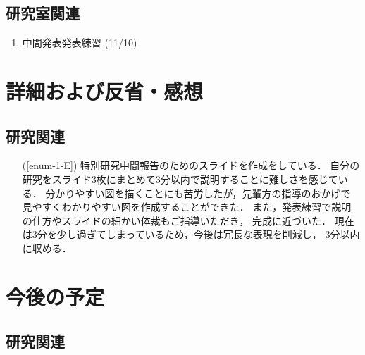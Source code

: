 \documentclass[fleqn, 14pt]{extarticle}
\begin{document}
\subsection{研究室関連}
\label{sec-2-2}
\begin{enumerate}
\item 中間発表発表練習
\hfill
\label{enum-lab1}
(11/10)
\end{enumerate}





\section{詳細および反省・感想}
\label{sec-3}
\subsection{研究関連}
\label{sec-3-1}

\begin{itemize}
\item[(\ref{enum-1-E})]
特別研究中間報告のためのスライドを作成をしている．
自分の研究をスライド3枚にまとめて3分以内で説明することに難しさを感じている．
分かりやすい図を描くことにも苦労したが，先輩方の指導のおかげで
見やすくわかりやすい図を作成することができた．
また，発表練習で説明の仕方やスライドの細かい体裁もご指導いただき，
完成に近づいた．
現在は3分を少し過ぎてしまっているため，今後は冗長な表現を削減し，
3分以内に収める．
\end{itemize}


\section{今後の予定}
\label{sec-4}
\subsection{研究関連}
\label{sec-4-1}
\end{document}
